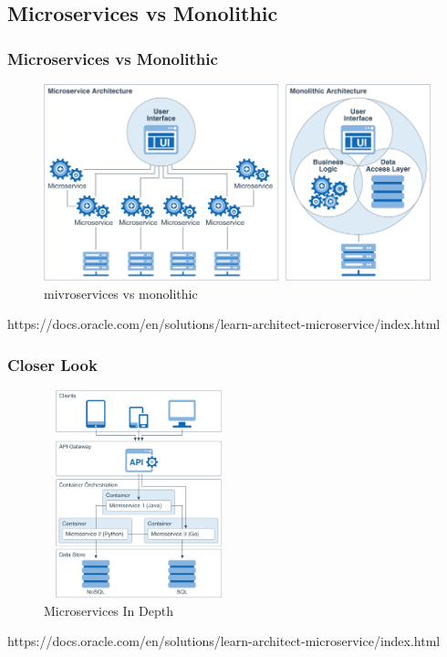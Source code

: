 \documentclass{beamer}
\begin{document}
	\subsection {Microservices vs Monolithic}
		\begin{frame}
			\frametitle{Microservices vs Monolithic}
				\begin{figure}[h]
					\includegraphics[width=0.8\linewidth]{img/monolithic_vs_microservice.png}
					\caption{mivroservices vs monolithic}
				\end{figure}
				
				
				\tiny{https://docs.oracle.com/en/solutions/learn-architect-microservice/index.html}		
		\end{frame}

		\begin{frame}
			\frametitle{Closer Look}
				\begin{figure}[h]
					\includegraphics[width=55mm, height=60mm, scale=1]{img/microservice_architecture.png}
					\caption{Microservices In Depth}
				\end{figure}
				
				
				\tiny{https://docs.oracle.com/en/solutions/learn-architect-microservice/index.html}	
		\end{frame}
	
\end{document}
